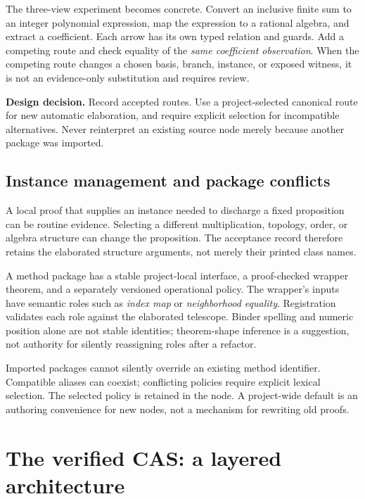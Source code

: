 \documentclass[11pt,letterpaper]{article}
\newcommand{\decision}[1]{\par\smallskip\textbf{Design decision.} #1\par\smallskip}
\theoremstyle{definition}
\begin{document}
The three-view experiment becomes concrete. Convert an inclusive finite sum to
an integer polynomial expression, map the expression to a rational algebra, and
extract a coefficient. Each arrow has its own typed relation and guards. Add a
competing route and check equality of the \emph{same coefficient observation}.
When the competing route changes a chosen basis, branch, instance, or exposed
witness, it is not an evidence-only substitution and requires review.

\decision{Record accepted routes. Use a project-selected canonical route for new
automatic elaboration, and require explicit selection for incompatible alternatives.
Never reinterpret an existing source node merely because another package was imported.}

\subsection{Instance management and package conflicts}
A local proof that supplies an instance needed to discharge a fixed proposition
can be routine evidence. Selecting a different multiplication, topology, order, or
algebra structure can change the proposition. The acceptance record therefore
retains the elaborated structure arguments, not merely their printed class names.

A method package has a stable project-local interface, a proof-checked wrapper
theorem, and a separately versioned operational policy. The wrapper's inputs have
semantic roles such as \emph{index map} or \emph{neighborhood equality}. Registration
validates each role against the elaborated telescope. Binder spelling and numeric
position alone are not stable identities; theorem-shape inference is a suggestion,
not authority for silently reassigning roles after a refactor.

Imported packages cannot silently override an existing method identifier.
Compatible aliases can coexist; conflicting policies require explicit lexical
selection. The selected policy is retained in the node. A project-wide default is
an authoring convenience for new nodes, not a mechanism for rewriting old proofs.

\section{The verified CAS: a layered architecture}\label{sec:cas}
\end{document}
